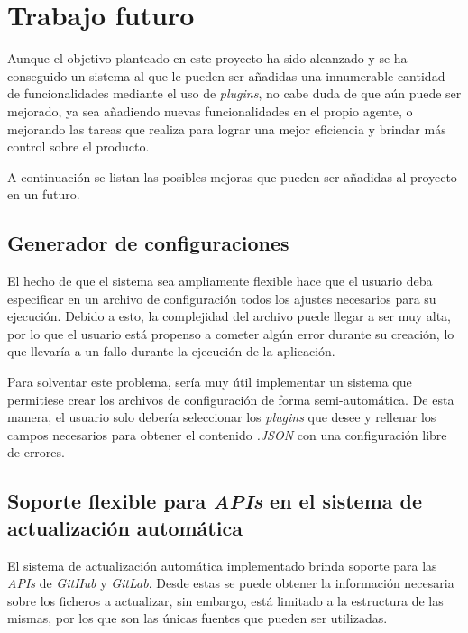 \section{Trabajo futuro}
        
    Aunque el objetivo planteado en este proyecto ha sido alcanzado y se ha conseguido un sistema al que le pueden ser añadidas una innumerable cantidad de funcionalidades mediante el uso de \textit{plugins}, no cabe duda de que aún puede ser mejorado, ya sea añadiendo nuevas funcionalidades en el propio agente, o mejorando las tareas que realiza para lograr una mejor eficiencia y brindar más control sobre el producto.
    
    A continuación se listan las posibles mejoras que pueden ser añadidas al proyecto en un futuro.
            
    \subsection{Generador de configuraciones}
        El hecho de que el sistema sea ampliamente flexible hace que el usuario deba especificar en un archivo de configuración todos los ajustes necesarios para su ejecución. Debido a esto, la complejidad del archivo puede llegar a ser muy alta, por lo que el usuario está propenso a cometer algún error durante su creación, lo que llevaría a un fallo durante la ejecución de la aplicación.
        
        Para solventar este problema, sería muy útil implementar un sistema que permitiese crear los archivos de configuración de forma semi-automática. De esta manera, el usuario solo debería seleccionar los \textit{plugins} que desee y rellenar los campos necesarios para obtener el contenido \textit{.JSON} con una configuración libre de errores.
        
    \subsection{Soporte flexible para \textit{APIs} en el sistema de actualización automática}
        El sistema de actualización automática implementado brinda soporte para las \textit{APIs} de \textit{GitHub} y \textit{GitLab}. Desde estas se puede obtener la información necesaria sobre los ficheros a actualizar, sin embargo, está limitado a la estructura de las mismas, por los que son las únicas fuentes que pueden ser utilizadas.
        
